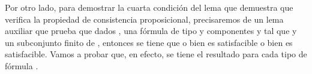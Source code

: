 \begin{isabellebody}
%
\endisadelimproof
%
\begin{isamarkuptext}%
Por otro lado, para demostrar la cuarta condición del lema  que demuestra que  
  verifica la propiedad de consistencia proposicional, precisaremos de un lema auxiliar que prueba 
  que dados ,  una fórmula de tipo \isa{{\isasymbeta}} y componentes  y  tal que  y  un 
  subconjunto finito de , entonces se tiene que o bien  es satisfacible o bien 
   es satisfacible. Vamos a probar que, en efecto, se tiene el resultado para cada tipo de fórmula \isa{{\isasymbeta}}.


\end{isamarkuptext}
\end{isabellebody}
